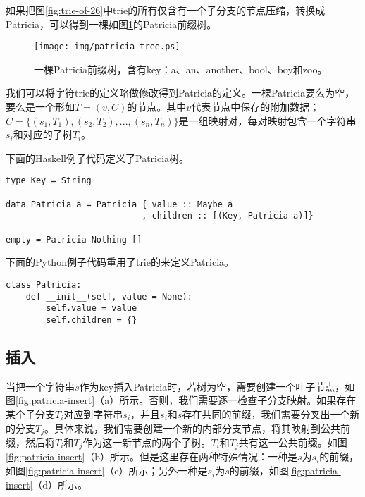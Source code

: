 \documentclass[UTF8]{article}
\begin{document}
如果把图\ref{fig:trie-of-26}中trie的所有仅含有一个子分支的节点压缩，转换成Patricia，可以得到一棵如图\ref{fig:patricia-tree}的Patricia前缀树。

\begin{figure}[htbp]
  \centering
  \texttt{[image: img/patricia-tree.ps]}
  \caption{一棵Patricia前缀树，含有key：a、an、another、bool、boy和zoo。}
  \label{fig:patricia-tree}
\end{figure}

我们可以将字符trie的定义略做修改得到Patricia的定义。一棵Patricia要么为空，要么是一个形如$T = (v, C)$的节点。其中$v$代表节点中保存的附加数据；$C = \{(s_1, T_1), (s_2, T_2), ..., (s_n, T_n)\}$是一组映射对，每对映射包含一个字符串$s_i$和对应的子树$T_i$。

下面的Haskell例子代码定义了Patricia树。

\lstset{language=Haskell}
\begin{lstlisting}
type Key = String

data Patricia a = Patricia { value :: Maybe a
                           , children :: [(Key, Patricia a)]}

empty = Patricia Nothing []
\end{lstlisting}

下面的Python例子代码重用了trie的来定义Patricia。

\lstset{language=Python}
\begin{lstlisting}
class Patricia:
    def __init__(self, value = None):
        self.value = value
        self.children = {}
\end{lstlisting}

\subsection{插入}

当把一个字符串$s$作为key插入Patricia时，若树为空，需要创建一个叶子节点，如图\ref{fig:patricia-insert}（a）所示。否则，我们需要逐一检查子分支映射。如果存在某个子分支$T_i$对应到字符串$s_i$，并且$s_i$和$s$存在共同的前缀，我们需要分叉出一个新的分支$T_j$。具体来说，我们需要创建一个新的内部分支节点，将其映射到公共前缀，然后将$T_i$和$T_j$作为这一新节点的两个子树。$T_i$和$T_j$共有这一公共前缀。如图\ref{fig:patricia-insert}（b）所示。但是这里存在两种特殊情况：一种是$s$为$s_i$的前缀，如图\ref{fig:patricia-insert}（c）所示；另外一种是$s_i$为$s$的前缀，如图\ref{fig:patricia-insert}（d）所示。
\end{document}
